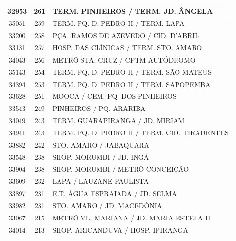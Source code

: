 \documentclass[
	12pt,				%
	oneside,			%
	a4paper,			%
	english,			%
	brazil				%
	]{abntex2ppgsi}
\begin{document}
\begin{apendicesenv}
\begin{longtable}{c|c|p{7cm}}
    32953 & 261   & TERM. PINHEIROS / TERM. JD. ÂNGELA \\
\hline

    35051 & 259   & TERM. PQ. D. PEDRO II / TERM. LAPA \\
\hline

    33200 & 258   & PÇA. RAMOS DE AZEVEDO / CID. D'ABRIL  \\
\hline

    33131 & 257   & HOSP. DAS CLÍNICAS / TERM. STO. AMARO \\
\hline

    34043 & 256   & METRÔ STA. CRUZ / CPTM AUTÓDROMO \\
\hline

    35143 & 254   & TERM. PQ. D. PEDRO II / TERM. SÃO MATEUS \\
\hline

    34394 & 253   & TERM. PQ. D. PEDRO II / TERM. SAPOPEMBA \\
\hline

    33628 & 251   & MOOCA / CEM. PQ. DOS PINHEIROS \\
\hline

    33543 & 249   & PINHEIROS / PQ. ARARIBA \\
\hline

    34049 & 243   & TERM. GUARAPIRANGA / JD. MIRIAM \\
\hline

    34941 & 243   & TERM. PQ. D. PEDRO II / TERM. CID. TIRADENTES \\
\hline

    33882 & 242   & STO. AMARO / JABAQUARA \\
\hline

    33548 & 238   & SHOP. MORUMBI / JD. INGÁ \\
\hline

    33904 & 238   & SHOP. MORUMBI / METRÔ CONCEIÇÃO \\
\hline

    33609 & 232   & LAPA / LAUZANE PAULISTA \\
\hline

    33897 & 231   & E.T. ÁGUA ESPRAIADA / JD. SELMA \\
\hline

    33982 & 231   & STO. AMARO / JD. MACEDÔNIA \\
\hline

    33067 & 215   & METRÔ VL. MARIANA / JD. MARIA ESTELA II \\
\hline

    34014 & 213   & SHOP. ARICANDUVA / HOSP. IPIRANGA \\
\hline


\end{longtable}
\end{apendicesenv}
\end{document}
